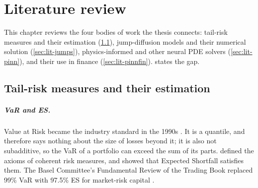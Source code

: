 \chapter{Literature review}
\label{ch:literature}

This chapter reviews the four bodies of work the thesis connects: tail-risk measures and their estimation
(\cref{sec:lit-risk}), jump-diffusion models and their numerical solution (\cref{sec:lit-jumps}),
physics-informed and other neural PDE solvers (\cref{sec:lit-pinn}), and their use in finance
(\cref{sec:lit-pinnfin}).  states the gap.

\section{Tail-risk measures and their estimation}
\label{sec:lit-risk}

\paragraph{VaR and ES.} Value at Risk became the industry standard in the 1990s \citep{jorion2007}. It is a
quantile, and therefore says nothing about the size of losses beyond it; it is also not subadditive, so the VaR of
a portfolio can exceed the sum of its parts.  defined the axioms of coherent risk measures, and
\citet{acerbi2002} showed that Expected Shortfall satisfies them. The Basel Committee's Fundamental Review of the
Trading Book replaced 99\% VaR with 97.5\% ES for market-risk capital \citep{bcbs2019}.

